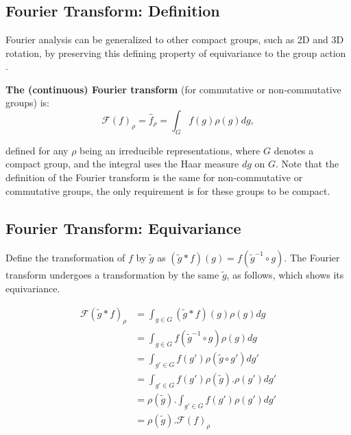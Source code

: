 \documentclass{article}
\begin{document}
\section{\color{deepblue}{Domain $\Omega = (G,~+)$ (compact groups)}}

\subsection{Fourier Transform: Definition}

Fourier analysis can be generalized to other compact groups, such as 2D and 3D rotation, by preserving this defining property of equivariance to the group action \cite{rudin1962fourier}.

\textbf{The (continuous) Fourier transform} (for commutative or non-commutative groups) is:
\begin{equation}
   \mathcal{F}(f)_\rho = \hat{f}_\rho = \int_G f(g)\rho(g) dg,
\end{equation}

defined for any $\rho$ being an irreducible representations, where $G$ denotes a compact group, and the integral uses the Haar measure $dg$ on $G$. Note that the definition of the Fourier transform is the same for non-commutative or commutative groups, the only requirement is for these groups to be compact.

\subsection{Fourier Transform: Equivariance}

Define the transformation of $f$ by $\tilde g$ as $(\tilde{g} \ast f)(g) = f({\tilde g}^{-1}\circ g)$. The Fourier transform undergoes a transformation by the same $\tilde g$, as follows, which shows its equivariance.

\vspace{-0.7cm}
\begin{align*}
  \mathcal{F}(\tilde{g} \ast f)_\rho
  &=  \int_{g \in G} (\tilde{g} \ast f)(g)\rho(g) dg \\
  &=  \int_{g \in G} f({\tilde g}^{-1}\circ g)\rho(g) dg \\
  &=  \int_{g' \in G} f(g')\rho(\tilde{g}\circ g') dg' \\
  &=  \int_{g' \in G} f(g')\rho(\tilde{g}).\rho(g') dg' \\
  &=  \rho(\tilde{g}) . \int_{g' \in G} f(g')\rho(g') dg' \\
  &=  \rho(\tilde{g}) .\mathcal{F}(f)_\rho
\end{align*}
\vspace{-0.7cm}
\end{document}
